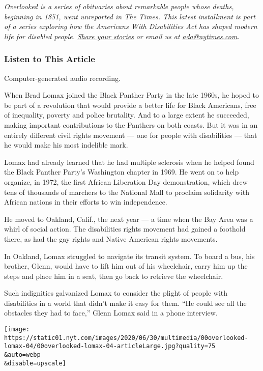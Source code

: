 \emph{Overlooked is a series of obituaries about remarkable people whose
deaths, beginning in 1851, went unreported in The Times. This latest
installment is part of a series exploring how the Americans With
Disabilities Act has shaped modern life for disabled people.}
\href{https://www.nytimes.com/2020/07/10/reader-center/disability-america-questions.html}{\emph{Share
your stories}} \emph{or email us at}
\href{mailto:ada@nytimes.com}{\emph{ada@nytimes.com}}\emph{.}

\hypertarget{listen-to-this-article}{%
\subsubsection{Listen to This Article}\label{listen-to-this-article}}

Computer-generated audio recording.

When Brad Lomax joined the Black Panther Party in the late 1960s, he
hoped to be part of a revolution that would provide a better life for
Black Americans, free of inequality, poverty and police brutality. And
to a large extent he succeeded, making important contributions to the
Panthers on both coasts. But it was in an entirely different civil
rights movement --- one for people with disabilities --- that he would
make his most indelible mark.

Lomax had already learned that he had multiple sclerosis when he helped
found the Black Panther Party's Washington chapter in 1969. He went on
to help organize, in 1972, the first African Liberation Day
demonstration, which drew tens of thousands of marchers to the National
Mall to proclaim solidarity with African nations in their efforts to win
independence.

He moved to Oakland, Calif., the next year --- a time when the Bay Area
was a whirl of social action. The disabilities rights movement had
gained a foothold there, as had the gay rights and Native American
rights movements.

In Oakland, Lomax struggled to navigate its transit system. To board a
bus, his brother, Glenn, would have to lift him out of his wheelchair,
carry him up the steps and place him in a seat, then go back to retrieve
the wheelchair.

Such indignities galvanized Lomax to consider the plight of people with
disabilities in a world that didn't make it easy for them. ``He could
see all the obstacles they had to face,'' Glenn Lomax said in a phone
interview.

\texttt{[image: https://static01.nyt.com/images/2020/06/30/multimedia/00overlooked-lomax-04/00overlooked-lomax-04-articleLarge.jpg?quality=75\\\&auto=webp\\\&disable=upscale]}


